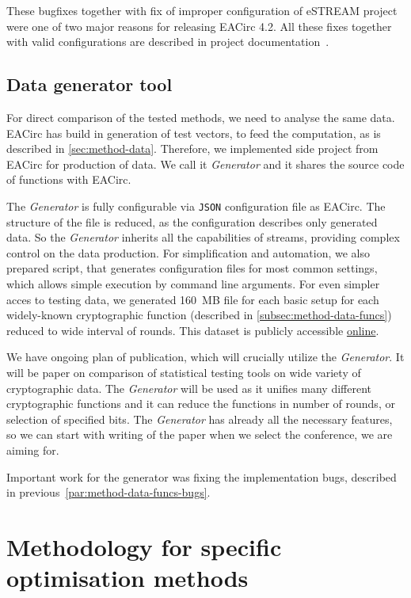 \documentclass[
  print, %
  Table,   %
  nolof,     %
  nolot,     %
  11pt, %
  oneside  %
]{fithesis3}
\begin{document}
These bugfixes together with fix of improper configuration of eSTREAM project were one of two major reasons for releasing EACirc 4.2. All these fixes together with valid configurations are described in project documentation~\cite{EACirc-wiki-streams}.

\subsection{Data generator tool}
\label{subsec:method-data-generator}

For direct comparison of the tested methods, we need to analyse the same data. EACirc has build in generation of test vectors, to feed the computation, as is described in \cref{sec:method-data}. Therefore, we implemented side project from EACirc for production of data. We call it \textit{Generator} and it shares the source code of functions with EACirc.

The \textit{Generator} is fully configurable via \texttt{JSON} configuration file as EACirc. The structure of the file is reduced, as the configuration describes only generated data. So the \textit{Generator} inherits all the capabilities of streams, providing complex control on the data production. For simplification and automation, we also prepared script, that generates configuration files for most common settings, which allows simple execution by command line arguments. For even simpler acces to testing data, we generated 160~MB file for each basic setup for each widely-known cryptographic function (described in \cref{subsec:method-data-funcs}) reduced to wide interval of rounds. This dataset is publicly accessible \href{https://drive.google.com/drive/folders/0B5Z1zst5NzwXQmFKaXgxREJWNk0?usp=sharing}{online}.

We have ongoing plan of publication, which will crucially utilize the \textit{Generator}. It will be paper on comparison of statistical testing tools on wide variety of cryptographic data. The \textit{Generator} will be used as it unifies many different cryptographic functions and it can reduce the functions in number of rounds, or selection of specified bits. The \textit{Generator} has already all the necessary features, so we can start with writing of the paper when we select the conference, we are aiming for.

Important work for the generator was fixing the implementation bugs, described in previous~\cref{par:method-data-funcs-bugs}.


\section{Methodology for specific optimisation methods}
\label{sec:method-spec}
\end{document}
